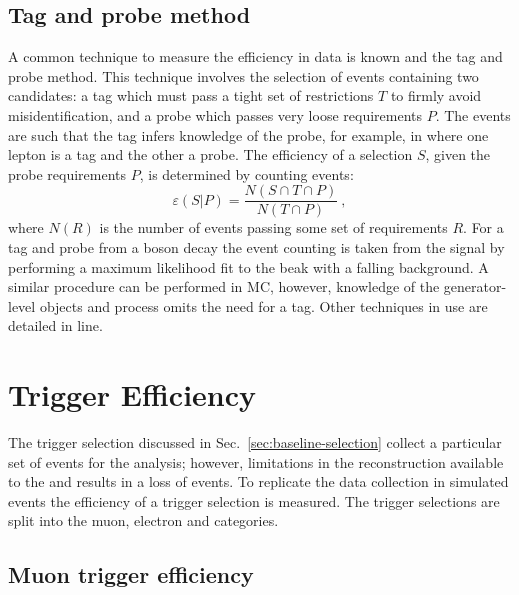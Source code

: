 \subsection{Tag and probe method}

A common technique to measure the efficiency in data is known and the tag and
probe method. This technique involves the selection of events containing two
candidates: a tag which must pass a tight set of restrictions $T$ to firmly
avoid misidentification, and a probe which passes very loose requirements $P$.
The events are such that the tag infers knowledge of the probe, for example,
in \IDYll where one lepton is a tag and the other a probe. The efficiency of a
selection $S$, given the probe requirements $P$, is determined by counting
events:
%
\begin{equation}
    \varepsilon(S|P) = \frac{N(S\cap T\cap P)}{N(T\cap P)}\ ,
\end{equation}
%
where $N(R)$ is the number of events passing some set of requirements $R$. For
a tag and probe from a \PZ boson decay the event counting is taken from the
signal by performing a maximum likelihood fit to the \PZ beak with a falling
background. A similar procedure can be performed in MC, however, knowledge of
the generator-level objects and process omits the need for a tag. Other
techniques in use are detailed in line.


\section{Trigger Efficiency}

The trigger selection discussed in Sec.~\ref{sec:baseline-selection} collect a
particular set of events for the analysis; however, limitations in the
reconstruction available to the \HWT and \SWT results in a loss of events. To
replicate the data collection in simulated events the efficiency of a trigger
selection is measured. The trigger selections are split into the muon, electron and
\ptmiss categories.


\subsection{Muon trigger efficiency}

